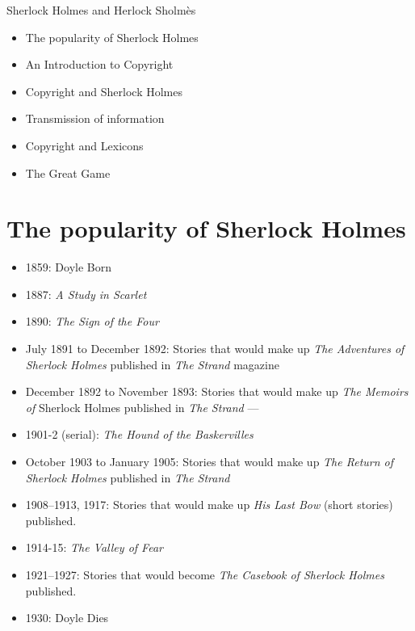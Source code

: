 \documentclass[a4paper,landscape,headrule,footrule,xetex]{foils}
\begin{document}
%
{Sherlock Holmes and Herlock Sholmès}
\maketitle

%



\begin{itemize}
\item The popularity of Sherlock Holmes
\item An Introduction to Copyright
\item Copyright and Sherlock Holmes
\item Transmission of information
\item Copyright and Lexicons
\item The Great Game
\end{itemize}


\section{The popularity of Sherlock Holmes}

\begin{itemize}\addtolength{\itemsep}{-1.5ex}
\item 1859: Doyle Born
\item 1887: \textit{A Study in Scarlet}
\item     1890: \textit{The Sign of the Four}
\item   July 1891 to December 1892: Stories that would make up \textit{The Adventures of Sherlock Holmes} published in 	\textit{The Strand} magazine
\item    December 1892 to November 1893: Stories that would make up \textit{The Memoirs of} Sherlock Holmes published in 	\textit{The Strand}   --- 
\item    1901-2 (serial): \textit{The Hound of the Baskervilles}
\item    October 1903 to January 1905: Stories that would make up \textit{The Return of Sherlock Holmes} published in 	\textit{The Strand}
\item 1908–1913, 1917: Stories that would make up \textit{His Last Bow} (short stories) published.
\item     1914-15: \textit{The Valley of Fear}
\item  1921–1927: Stories that would become \textit{The Casebook of Sherlock Holmes} published. 
\item 1930: Doyle Dies
\end{itemize}
\end{document}
